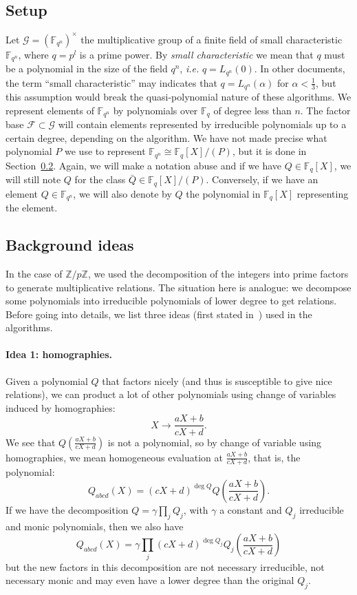 \documentclass[a4paper,11pt]{article}
\theoremstyle{break}
\theoremstyle{sc}
\theoremstyle{definition}
\theoremstyle{remark}
\newcommand{\ie}{\emph{i.e. }}
\begin{document}
\subsection{Setup}
\label{general-setup}

Let $\mathcal G = (\mathbb{F}_{q^n})^\times$ the multiplicative group of a finite
field of small characteristic $\mathbb{F}_{q^n}$, where $q=p^l$ is a prime
power. By
\emph{small characteristic} we mean that $q$ must be a polynomial in the size of
the field $q^n$, \ie $q = L_{q^n}(0)$. In other documents, the term ``small
characteristic'' may indicates that $q = L_{q^n}(\alpha)$ for
$\alpha<\frac{1}{3}$, but this assumption would break the quasi-polynomial
nature of these algorithms. We represent elements of
$\mathbb{F}_{q^n}$ by polynomials over $\mathbb{F}_{q}$ of degree less than
$n$. The factor base $\mathcal F\subset\mathcal G$ will contain elements
represented by irreducible polynomials up to a certain degree, depending on the
algorithm. We have not made
precise what polynomial $P$ we use to represent
$\mathbb{F}_{q^n}\cong\mathbb{F}_{q}[X]/(P)$, but it is done
in Section~\ref{ideas}. Again, we will make a notation abuse and if we have
$Q\in \mathbb{F}_{q}[X]$, we will still note $Q$ for the class $\bar Q\in
\mathbb{F}_{q}[X]/(P)$. Conversely, if we have an element $Q\in
\mathbb{F}_{q^{n}}$, we
will also denote by $Q$ the polynomial in $\mathbb{F}_{q}[X]$ representing the
element.

\subsection{Background ideas}
\label{ideas}

In the case of $\mathbb{Z}/p\mathbb{Z}$, we used the decomposition of the
integers into prime factors to generate multiplicative relations. The situation
here is analogue: we decompose some polynomials into irreducible polynomials of
lower degree to get relations. Before going into details, we list three ideas
(first stated in~\cite{Joux13}) used in the algorithms.

\paragraph{Idea 1: homographies.} Given a polynomial $Q$ that factors nicely
(and thus is susceptible to give nice relations), we can product a lot of other
polynomials using change of variables induced by homographies:
\[
  X\to\frac{aX+b}{cX+d}.
\]
We see that $Q(\frac{aX+b}{cX+d})$ is not a polynomial, so by change of variable
using homographies, we mean homogeneous evaluation at $\frac{aX+b}{cX+d}$,
that is, the polynomial:
\[
  Q_{abcd}(X) = (cX+d)^{\deg Q}Q\left(\frac{aX+b}{cX+d} \right).
\]
If we have the decomposition $Q=\gamma\prod_j Q_j$, with $\gamma$ a constant and
$Q_j$ irreducible and monic polynomials, then we also have
\[
  Q_{abcd}(X) = \gamma\prod_j (cX+d)^{\deg Q_j}Q_j(\frac{aX+b}{cX+d})
\]
but the new factors in this decomposition are not necessary irreducible, not
necessary monic and may even have a lower degree than the original $Q_j$.
\end{document}
